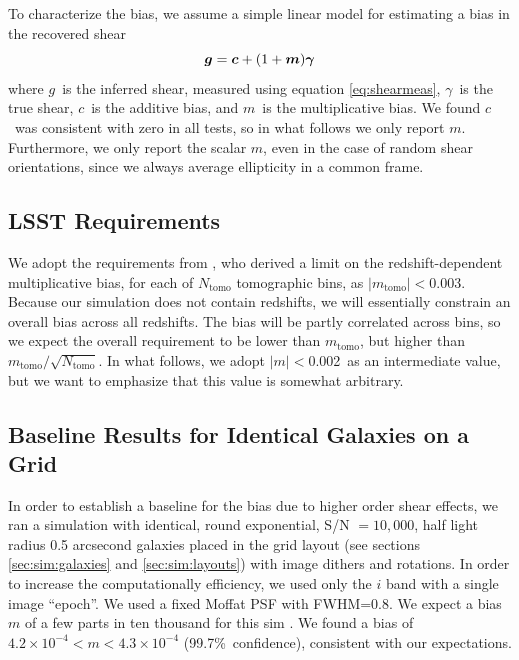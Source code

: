 \documentclass[twocolumn,twocolappendix,astrosym]{openjournal}
\newcommand{\vecg}{\mbox{\boldmath $g$}}
\newcommand{\vecc}{\mbox{\boldmath $c$}}
\newcommand{\vecm}{\mbox{\boldmath $m$}}
\newcommand{\vecgam}{\mbox{\boldmath $\gamma$}}
\newcommand{\mthresh}{0.002}
\begin{document}
To characterize the bias, we assume a simple linear model \citep[see,
e.g.,][]{heymans2006} for estimating a bias in the recovered shear
\begin{equation} \label{eq:m}
\vecg = \vecc + (1 + \vecm) \vecgam
\end{equation}
where \vecg\ is the inferred shear, measured using equation \ref{eq:shearmeas},
\vecgam\ is the true shear, \vecc\ is the additive bias, and \vecm\ is the
multiplicative bias. We found \vecc\ was consistent with zero in all tests, so
in what follows we only report \vecm.  Furthermore, we only report
the scalar $m$, even in the case of random shear orientations, since we
always average ellipticity in a common frame.

\subsection{LSST Requirements} \label{sec:lsstreq}

We adopt the requirements from \cite{SRD}, who derived a limit on the
redshift-dependent multiplicative bias, for each of $N_{\mathrm{tomo}}$
tomographic bins, as $|m_{\mathrm{tomo}}| < 0.003$.  Because our simulation
does not contain redshifts, we will essentially constrain an overall bias
across all redshifts.  The bias will be partly correlated across bins, so we
expect the overall requirement to be lower than $m_{\mathrm{tomo}}$, but higher
than $m_{\mathrm{tomo}}/\sqrt{N_{\mathrm{tomo}}}$.  In what follows, we adopt
$|m| < $\mthresh\ as an intermediate value, but we want to emphasize that this
value is somewhat arbitrary.

\subsection{Baseline Results for Identical Galaxies on a Grid} \label{sec:results:base}

In order to establish a baseline for the bias due to higher order shear
effects, we ran a simulation with identical, round exponential, S/N $= 10,000$,
half light radius 0.5 arcsecond galaxies placed in the grid layout (see
sections \ref{sec:sim:galaxies} and \ref{sec:sim:layouts}) with image dithers
and rotations.  In order to increase the computationally efficiency, we used
only the $i$ band with a single image ``epoch''.  We used a fixed Moffat
PSF\citep{Moffat1969} with FWHM=0.8.  We expect a bias $m$ of a few parts in
ten thousand for this sim \citep{SheldonMcal2017}.  We found a bias of
$4.2\times 10^{-4} < m < 4.3\times 10^{-4}$ (99.7\%~confidence), consistent
with our expectations.
\end{document}
